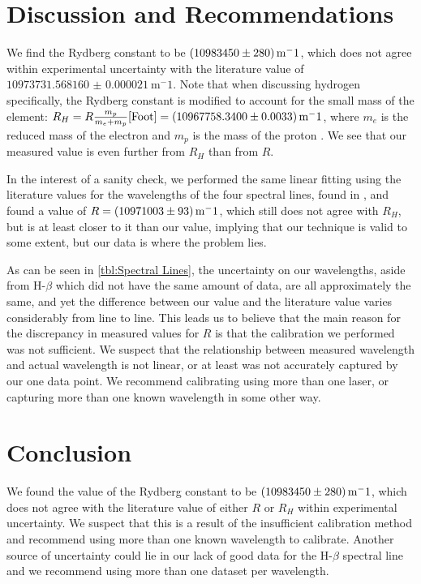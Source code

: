 \documentclass[11pt]{article}
\numberwithin{equation}{section}
\numberwithin{figure}{section}
\numberwithin{table}{section}
\begin{document}
\section{Discussion and Recommendations}\label{sec:DiscussionRecommendations}
\par We find the Rydberg constant to be $\SI{10983450\pm280}{\metre^-1}$, which does not agree within experimental uncertainty with the literature value of $\SI{10973731.568160(21)}{\metre^-1}$\cite{CODATA}. Note that when discussing hydrogen specifically, the Rydberg constant is modified to account for the small mass of the element: $R_H=R\frac{m_p}{m_e+m_p}\cite{Foot}=\SI{10967758.340\pm0.0033}{\metre^-1}$, where $m_e$ is the reduced mass of the electron and $m_p$ is the mass of the proton \cite{CODATA}. We see that our measured value is even further from $R_H$ than from $R$. 
\par In the interest of a sanity check, we performed the same linear fitting using the literature values for the wavelengths of the four spectral lines, found in \cite{Spectral Lines}, and found a value of $R=\SI{10971003\pm93}{\metre^-1}$, which still does not agree with $R_H$, but is at least closer to it than our value, implying that our technique is valid to some extent, but our data is where the problem lies.
\par As can be seen in \autoref{tbl:Spectral Lines}, the uncertainty on our wavelengths, aside from H-$\beta$ which did not have the same amount of data, are all approximately the same, and yet the difference between our value and the literature value varies considerably from line to line. This leads us to believe that the main reason for the discrepancy in measured values for $R$ is that the calibration we performed was not sufficient. We suspect that the relationship between measured wavelength and actual wavelength is not linear, or at least was not accurately captured by our one data point. We recommend calibrating using more than one laser, or capturing more than one known wavelength in some other way.

\section{Conclusion}\label{sec:Conclusion}
\par We found the value of the Rydberg constant to be $\SI{10983450\pm280}{\metre^-1}$, which does not agree with the literature value of either $R$ or $R_H$ within experimental uncertainty. We suspect that this is a result of the insufficient calibration method and recommend using more than one known wavelength to calibrate. Another source of uncertainty could lie in our lack of good data for the H-$\beta$ spectral line and we recommend using more than one dataset per wavelength.
\end{document}
